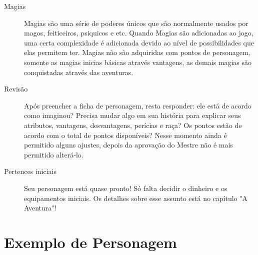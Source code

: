 \begin{description}
\item[Magias] Magias são uma série de poderes únicos que são normalmente usados por magos, feiticeiros, psiquicos e etc. Quando Magias são adicionadas ao jogo, uma certa complexidade é adicionada devido ao nível de possibilidades que elas permitem ter. Magias não são adquiridas com pontos de personagem, somente as magias inicias básicas através vantagens, as demais magias são conquistadas através das aventuras.

\item[Revisão] Após preencher a ficha de personagem, resta responder: ele está de acordo como imaginou? Precisa mudar algo em sua história para explicar seus atributos, vantagens, desvantagens, perícias e raça? Os pontos estão de acordo com o total de pontos disponíveis? Nesse momento ainda é permitido alguns ajustes, depois da aprovação do Mestre não é mais permitido alterá-lo.

\item[Pertences iniciais] Seu personagem está quase pronto! Só falta decidir o dinheiro e os equipamentos iniciais. Os detalhes sobre esse assunto está no capítulo "A Aventura"!

\end{description} 

\section{Exemplo de Personagem}




